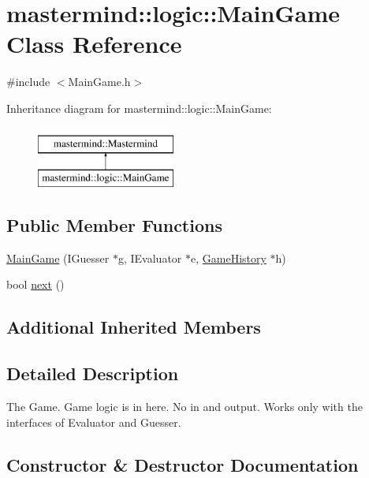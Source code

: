\hypertarget{classmastermind_1_1logic_1_1_main_game}{}\section{mastermind\+:\+:logic\+:\+:Main\+Game Class Reference}
\label{classmastermind_1_1logic_1_1_main_game}


{\ttfamily \#include $<$Main\+Game.\+h$>$}

Inheritance diagram for mastermind\+:\+:logic\+:\+:Main\+Game\+:\begin{figure}[H]
\begin{center}
\leavevmode
\includegraphics[height=2.000000cm]{classmastermind_1_1logic_1_1_main_game}
\end{center}
\end{figure}
\subsection*{Public Member Functions}
\begin{DoxyCompactItemize}
\item 
\hyperlink{classmastermind_1_1logic_1_1_main_game_af1a4d71009b1d4322edec911ea39b55c}{Main\+Game} (I\+Guesser $\ast$g, I\+Evaluator $\ast$e, \hyperlink{classmastermind_1_1logic_1_1_game_history}{Game\+History} $\ast$h)
\item 
bool \hyperlink{classmastermind_1_1logic_1_1_main_game_a2b48f18cf8dbd95431d4627b57ea5d01}{next} ()
\end{DoxyCompactItemize}
\subsection*{Additional Inherited Members}


\subsection{Detailed Description}
The Game. Game logic is in here. No in and output. Works only with the interfaces of {\ttfamily Evaluator} and {\ttfamily Guesser}. 

\subsection{Constructor \& Destructor Documentation}
\hypertarget{classmastermind_1_1logic_1_1_main_game_af1a4d71009b1d4322edec911ea39b55c}{}\label{classmastermind_1_1logic_1_1_main_game_af1a4d71009b1d4322edec911ea39b55c} 

